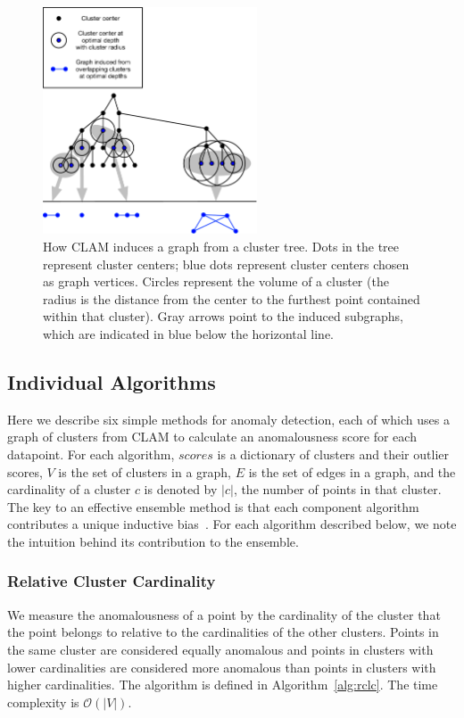 \begin{figure}[ht!]
    \centering
    \includegraphics[width=2.5in]{images/tree-graph.pdf}
    \caption{How CLAM induces a graph from a cluster tree.
        Dots in the tree represent cluster centers;
        blue dots represent cluster centers chosen as graph vertices.
        Circles represent the volume of a cluster (the radius is the distance from the center to the furthest point contained within that cluster).
        Gray arrows point to the induced subgraphs, which are indicated in blue below the horizontal line.}
    \label{fig:methods:graph-generation}
\end{figure}


\subsection{Individual Algorithms}
\label{subsec:methods:individual-algorithms}

Here we describe six simple methods for anomaly detection, each of which uses a graph of clusters from CLAM to calculate an anomalousness score for each datapoint.
For each algorithm, $scores$ is a dictionary of clusters and their outlier scores,
$V$ is the set of clusters in a graph,
$E$ is the set of edges in a graph, and
the cardinality of a cluster $c$ is denoted by $|c|$, the number of points in that cluster.
The key to an effective ensemble method is that each component algorithm contributes a unique inductive bias~\cite{}.
For each algorithm described below, we note the intuition behind its contribution to the ensemble.

\subsubsection{Relative Cluster Cardinality}
We measure the anomalousness of a point by the cardinality of the cluster that the point belongs to relative to the cardinalities of the other clusters.
Points in the same cluster are considered equally anomalous and points in clusters with lower cardinalities are considered more anomalous than points in clusters with higher cardinalities.
The algorithm is defined in Algorithm~\ref{alg:rclc}.
The time complexity is $\mathcal{O}(|V|)$.

